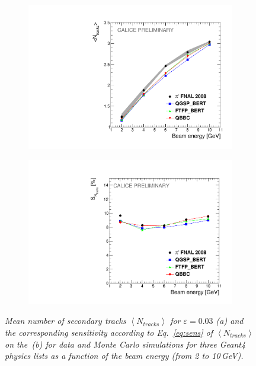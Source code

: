\begin{figure}
	\centering
	\begin{subfigure}{0.5\textwidth}
		\centering
		\includegraphics[width=.90\linewidth]{ECAL/plots/ntracks-graph.pdf}
		\caption{\label{fig:tracksgraphF} }
	\end{subfigure}%
	\begin{subfigure}{0.5\textwidth}
		\centering
		\includegraphics[width=.90\linewidth]{ECAL/plots/ntracks-graph-delta.pdf}
		\caption{\label{fig:dtracksgraphF}}
	\end{subfigure}
	\caption{\label{fig:fulltrackgraphF} \sl Mean number of secondary tracks $\left<N_{tracks}\right>$ for $\varepsilon = 0.03$ (a) and the corresponding sensitivity according to Eq.~\ref{eq:sens} of $\left<N_{tracks}\right>$ on the \ep\,(b) for data and Monte Carlo simulations for three {\sc Geant}4 physics lists as a function of the beam energy (from 2 to 10\,GeV). }
\end{figure}

